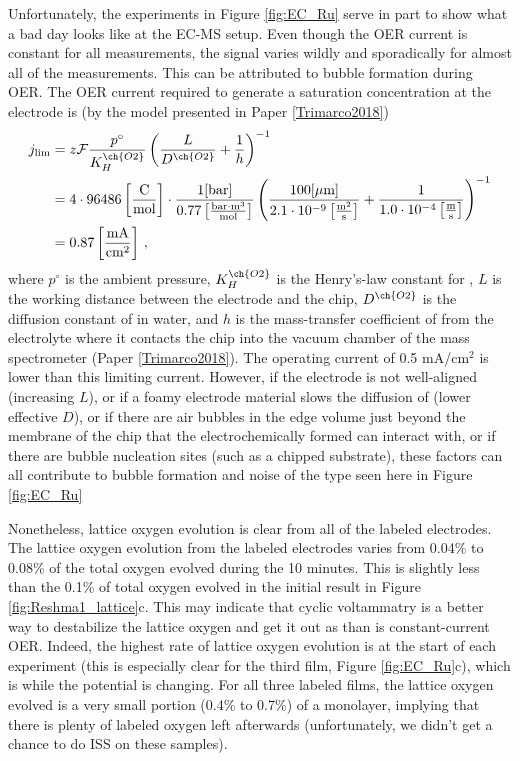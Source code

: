 Unfortunately, the experiments in Figure \ref{fig:EC_Ru} serve in part to show what a bad day looks like at the EC-MS setup. Even though the OER current is constant for all measurements, the  signal varies wildly and sporadically for almost all of the measurements. This can be attributed to bubble formation during OER. The OER current required to generate a saturation concentration at the electrode is (by the model presented in Paper \ref{Trimarco2018}) 
\begin{align}
j_{\text{lim}} &= z\mathcal{F}\frac{p^\circ}{K_H^{\ch{O2}}}\left(\frac{L}{D^{\ch{O2}}} + \frac{1}{h}\right)^{-1}\label{eq:limiting} \\
 &= 4\cdot 96486 \left[\frac{\text{C}}{\text{mol}}\right]\cdot\frac{1 \text{[bar]}}{0.77 \left[\frac{\text{bar}\cdot\text{m}^3}{\text{mol}}\right]} \left(\frac{100[\mu\text{m}]}{2.1\cdot 10^{-9} \left[\frac{\text{m}^2}{\text{s}}\right]} + \frac{1}{1.0\cdot 10^{-4} \left[\frac{\text{m}}{\text{s}}\right]} \right)^{-1}\\
 &=0.87 \left[\frac{\text{mA}}{\text{cm}^2}\right]\,,
\end{align}
where $p^\circ$ is the ambient pressure, $K_H^{\ch{O2}}$ is the Henry's-law constant for , $L$ is the working distance between the electrode and the chip, $D^{\ch{O2}}$ is the diffusion constant of  in water, and $h$ is the mass-transfer coefficient of  from the electrolyte where it contacts the chip into the vacuum chamber of the mass spectrometer (Paper \ref{Trimarco2018}). The operating current of 0.5 mA/cm$^2$ is lower than this limiting current. However, if the electrode is not well-aligned (increasing $L$), or if a foamy electrode material slows the diffusion of  (lower effective $D$), or if there are air bubbles in the edge volume just beyond the membrane of the chip that the electrochemically formed  can interact with, or if there are bubble nucleation sites (such as a chipped substrate), these factors can all contribute to bubble formation and noise of the type seen here in Figure \ref{fig:EC_Ru}

Nonetheless, lattice oxygen evolution is clear from all of the labeled electrodes. The lattice oxygen evolution from the labeled  electrodes varies from 0.04\% to 0.08\% of the total oxygen evolved during the 10 minutes. This is slightly less than the 0.1\% of total oxygen evolved in the initial result in Figure \ref{fig:Reshma1_lattice}c. This may indicate that cyclic voltammatry is a better way to destabilize the lattice oxygen and get it out as  than is constant-current OER. Indeed, the highest rate of lattice oxygen evolution is at the start of each experiment (this is especially clear for the third film, Figure \ref{fig:EC_Ru}c), which is while the potential is changing. For all three labeled  films, the lattice oxygen evolved is a very small portion (0.4\% to 0.7\%) of a monolayer, implying that there is plenty of labeled oxygen left afterwards (unfortunately, we didn't get a chance to do ISS on these samples).

